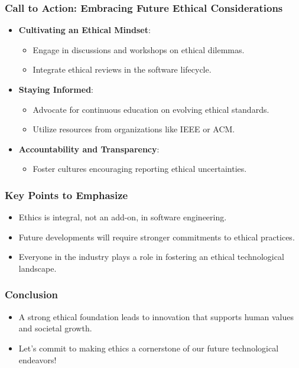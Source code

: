 \documentclass{beamer}
\begin{document}
\begin{frame}[fragile]
    \frametitle{Call to Action: Embracing Future Ethical Considerations}
    \begin{itemize}
        \item \textbf{Cultivating an Ethical Mindset}:
        \begin{itemize}
            \item Engage in discussions and workshops on ethical dilemmas.
            \item Integrate ethical reviews in the software lifecycle.
        \end{itemize}
        \item \textbf{Staying Informed}:
        \begin{itemize}
            \item Advocate for continuous education on evolving ethical standards.
            \item Utilize resources from organizations like IEEE or ACM.
        \end{itemize}
        \item \textbf{Accountability and Transparency}:
        \begin{itemize}
            \item Foster cultures encouraging reporting ethical uncertainties.
        \end{itemize}
    \end{itemize}
\end{frame}

\begin{frame}[fragile]
    \frametitle{Key Points to Emphasize}
    \begin{itemize}
        \item Ethics is integral, not an add-on, in software engineering.
        \item Future developments will require stronger commitments to ethical practices.
        \item Everyone in the industry plays a role in fostering an ethical technological landscape.
    \end{itemize}
\end{frame}

\begin{frame}[fragile]
    \frametitle{Conclusion}
    \begin{itemize}
        \item A strong ethical foundation leads to innovation that supports human values and societal growth.
        \item Let's commit to making ethics a cornerstone of our future technological endeavors!
    \end{itemize}
\end{frame}
\end{document}
